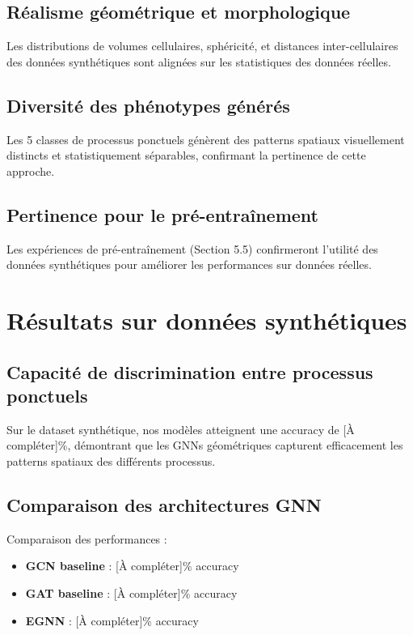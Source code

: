\subsection{Réalisme géométrique et morphologique}

Les distributions de volumes cellulaires, sphéricité, et distances inter-cellulaires des données synthétiques sont alignées sur les statistiques des données réelles.

\subsection{Diversité des phénotypes générés}

Les 5 classes de processus ponctuels génèrent des patterns spatiaux visuellement distincts et statistiquement séparables, confirmant la pertinence de cette approche.

\subsection{Pertinence pour le pré-entraînement}

Les expériences de pré-entraînement (Section 5.5) confirmeront l'utilité des données synthétiques pour améliorer les performances sur données réelles.

\section{Résultats sur données synthétiques}

\subsection{Capacité de discrimination entre processus ponctuels}

Sur le dataset synthétique, nos modèles atteignent une accuracy de [À compléter]\%, démontrant que les GNNs géométriques capturent efficacement les patterns spatiaux des différents processus.

\subsection{Comparaison des architectures GNN}

Comparaison des performances :
\begin{itemize}
    \item \textbf{GCN baseline} : [À compléter]\% accuracy
    \item \textbf{GAT baseline} : [À compléter]\% accuracy
    \item \textbf{EGNN} : [À compléter]\% accuracy
\end{itemize}

